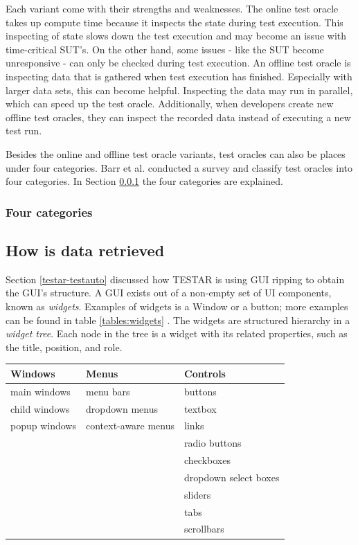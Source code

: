 Each variant come with their strengths and weaknesses. The online test oracle takes up compute time because it inspects the state during test execution. This inspecting of state slows down the test execution and may become an issue with time-critical SUT's. On the other hand, some issues - like the SUT become unresponsive - can only be checked during test execution. An offline test oracle is inspecting data that is gathered when test execution has finished. Especially with larger data sets, this can become helpful. Inspecting the data may run in parallel, which can speed up the test oracle. Additionally, when developers create new offline test oracles, they can inspect the recorded data instead of executing a new test run. \cite{de2019offline}

Besides the online and offline test oracle variants, test oracles can also be places under four categories. Barr et al. conducted a survey and classify test oracles into four categories. In Section \ref{to:four-cat} the four categories are explained. 

\subsubsection{Four categories} \label{to:four-cat}


\subsection{How is data retrieved}

Section \ref{testar-testauto} discussed how TESTAR is using GUI ripping to obtain the GUI's structure. A GUI exists out of a non-empty set of UI components, known as \emph{widgets}. Examples of widgets is a Window or a button; more examples can be found in table \ref{tables:widgets} \cite{VosAho2021}. The widgets are structured hierarchy in a \emph{widget tree}. Each node in the tree is a widget with its related properties, such as the title, position, and role.

\begin{tabularx}{\textwidth}{ 
  | >{\raggedright\arraybackslash}X 
  | >{\raggedright\arraybackslash}X 
  | >{\raggedright\arraybackslash}X | }
    \hline
    Windows & Menus & Controls \\
    \hline
    \hline
    main windows & menu bars & buttons \\
    child windows & dropdown menus & textbox \\
    popup windows & context-aware menus & links \\
    && radio buttons \\
    && checkboxes\\
    && dropdown select boxes\\
    && sliders\\
    && tabs\\
    && scrollbars \\
    \hline
\end{tabularx}
\label{tables:widgets}

